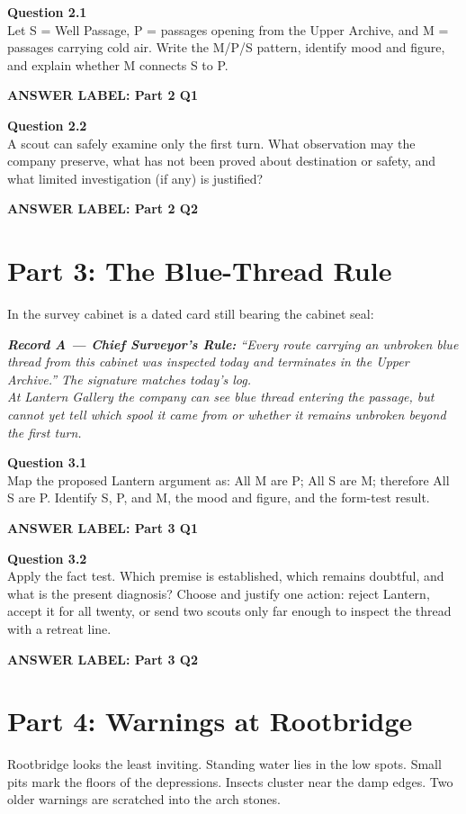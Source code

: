 \documentclass[12pt]{article}
\newcommand{\answerbox}[2]{\par\vspace{0.1em}\noindent\textbf{#1}\par\vspace{0.03em}\noindent\fbox{\begin{minipage}[t][#2]{\dimexpr\textwidth-2\fboxsep-2\fboxrule}\rule{\textwidth}{0pt}\vspace{#2}\end{minipage}}\par\vspace{0.18em}}
\newcommand{\cluebox}[1]{\par\vspace{0.12em}\noindent\begin{minipage}{\textwidth}\itshape #1\end{minipage}\par\vspace{0.12em}}
\begin{document}
\textbf{Question 2.1}\\[-0.15em]
Let S = Well Passage, P = passages opening from the Upper Archive, and M = passages carrying cold air. Write the M/P/S pattern, identify mood and figure, and explain whether M connects S to P.
\answerbox{ANSWER LABEL: Part 2 Q1}{2.1in}

\textbf{Question 2.2}\\[-0.15em]
A scout can safely examine only the first turn. What observation may the company preserve, what has not been proved about destination or safety, and what limited investigation (if any) is justified?
\answerbox{ANSWER LABEL: Part 2 Q2}{1.75in}

\newpage
\section*{Part 3: The Blue-Thread Rule}
In the survey cabinet is a dated card still bearing the cabinet seal:

\cluebox{\textbf{Record A --- Chief Surveyor's Rule:} ``Every route carrying an unbroken blue thread from this cabinet was inspected today and terminates in the Upper Archive.'' The signature matches today's log.\\[0.25em]
At Lantern Gallery the company can see blue thread entering the passage, but cannot yet tell which spool it came from or whether it remains unbroken beyond the first turn.}

\textbf{Question 3.1}\\[-0.15em]
Map the proposed Lantern argument as: All M are P; All S are M; therefore All S are P. Identify S, P, and M, the mood and figure, and the form-test result.
\answerbox{ANSWER LABEL: Part 3 Q1}{1.8in}

\textbf{Question 3.2}\\[-0.15em]
Apply the fact test. Which premise is established, which remains doubtful, and what is the present diagnosis? Choose and justify one action: reject Lantern, accept it for all twenty, or send two scouts only far enough to inspect the thread with a retreat line.
\answerbox{ANSWER LABEL: Part 3 Q2}{1.8in}

\newpage
\section*{Part 4: Warnings at Rootbridge}
Rootbridge looks the least inviting. Standing water lies in the low spots. Small pits mark the floors of the depressions. Insects cluster near the damp edges. Two older warnings are scratched into the arch stones.
\end{document}
